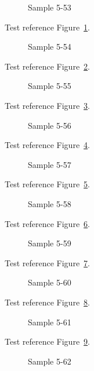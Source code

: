 \begin{figure}[tbhp]
\caption{Sample 5-53}
\label{fig:sample-5-53}
\end{figure}

Test reference Figure~\ref{fig:sample-5-53}.

\begin{figure}[tbhp]
\caption{Sample 5-54}
\label{fig:sample-5-54}
\end{figure}

Test reference Figure~\ref{fig:sample-5-54}.

\begin{figure}[tbhp]
\caption{Sample 5-55}
\label{fig:sample-5-55}
\end{figure}

Test reference Figure~\ref{fig:sample-5-55}.

\begin{figure}[tbhp]
\caption{Sample 5-56}
\label{fig:sample-5-56}
\end{figure}

Test reference Figure~\ref{fig:sample-5-56}.

\begin{figure}[tbhp]
\caption{Sample 5-57}
\label{fig:sample-5-57}
\end{figure}

Test reference Figure~\ref{fig:sample-5-57}.

\begin{figure}[tbhp]
\caption{Sample 5-58}
\label{fig:sample-5-58}
\end{figure}

Test reference Figure~\ref{fig:sample-5-58}.

\begin{figure}[tbhp]
\caption{Sample 5-59}
\label{fig:sample-5-59}
\end{figure}

Test reference Figure~\ref{fig:sample-5-59}.

\begin{figure}[tbhp]
\caption{Sample 5-60}
\label{fig:sample-5-60}
\end{figure}

Test reference Figure~\ref{fig:sample-5-60}.

\begin{figure}[tbhp]
\caption{Sample 5-61}
\label{fig:sample-5-61}
\end{figure}

Test reference Figure~\ref{fig:sample-5-61}.

\begin{figure}[tbhp]
\caption{Sample 5-62}
\label{fig:sample-5-62}
\end{figure}

